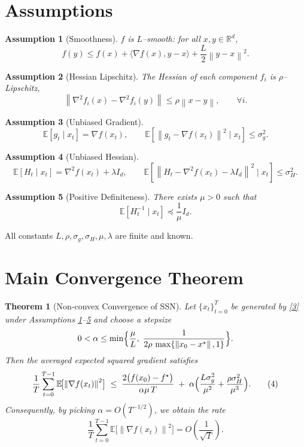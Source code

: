 \documentclass{article}
\newtheorem{theorem}{Theorem}
\newtheorem{assumption}{Assumption}
\newcommand{\E}{\mathbb{E}}
\newcommand{\norm}[1]{\left\|#1\right\|}
\newcommand{\iprod}[2]{\langle #1,#2\rangle}
\begin{document}
\newpage
\section*{Assumptions}
\begin{assumption}[Smoothness]\label{as:smooth}
$f$ is $L$–smooth: for all $x,y\in\mathbb{R}^d$,
\[
f(y)\le f(x)+\iprod{\nabla f(x)}{y-x}+\frac{L}{2}\norm{y-x}^2 .
\]
\end{assumption}
\begin{assumption}[Hessian Lipschitz]\label{as:hess}
The Hessian of each component $f_i$ is $\rho$–Lipschitz,
\[
\norm{\nabla^{2}f_i(x)-\nabla^{2}f_i(y)}\le\rho\norm{x-y},\qquad\forall i.
\]
\end{assumption}
\begin{assumption}[Unbiased Gradient]\label{as:grad}
\[
\E[g_t\mid x_t]=\nabla f(x_t),\qquad 
\E\!\left[\norm{g_t-\nabla f(x_t)}^2\mid x_t\right]\le\sigma_g^{2}.
\]
\end{assumption}
\begin{assumption}[Unbiased Hessian]\label{as:hess}
\[
\E[H_t\mid x_t]=\nabla^{2}f(x_t)+\lambda I_d,\qquad 
\E\!\left[\norm{H_t-\nabla^{2}f(x_t)-\lambda I_d}^2\mid x_t\right]\le\sigma_H^{2}.
\]
\end{assumption}
\begin{assumption}[Positive Definiteness]\label{as:posdef}
There exists $\mu>0$ such that
\[
\E[H_t^{-1}\mid x_t]\preceq \frac{1}{\mu}I_d .
\]
\end{assumption}
All constants $L,\rho,\sigma_g,\sigma_H,\mu,\lambda$ are finite and known.

\section*{Main Convergence Theorem}
\begin{theorem}[Non‑convex Convergence of SSN]\label{thm:main}
Let $\{x_t\}_{t=0}^{T}$ be generated by \eqref{3} under Assumptions \ref{as:smooth}–\ref{as:posdef} and choose a stepsize
\[
0<\alpha\le\min\Bigl\{\frac{\mu}{L},\;\frac{1}{2\rho\,\max\{\norm{x_0-x^\star},1\}}\Bigr\}.
\]
Then the averaged expected squared gradient satisfies
\[
\frac{1}{T}\sum_{t=0}^{T-1}\E\!\bigl[\norm{\nabla f(x_t)}^2\bigr]
\;\le\;
\frac{2\bigl(f(x_0)-f^\star\bigr)}{\alpha\mu\,T}
\;+\;
\alpha\Bigl(\frac{L\sigma_g^{2}}{\mu^{2}}+\frac{\rho\sigma_H^{2}}{\mu^{3}}\Bigr) .
\tag{4}
\]
Consequently, by picking $\alpha=O(T^{-1/2})$, we obtain the rate
\[
\frac{1}{T}\sum_{t=0}^{T-1}\E\!\bigl[\norm{\nabla f(x_t)}^2\bigr]=O\!\left(\frac{1}{\sqrt{T}}\right).
\]
\end{theorem}
\end{document}
